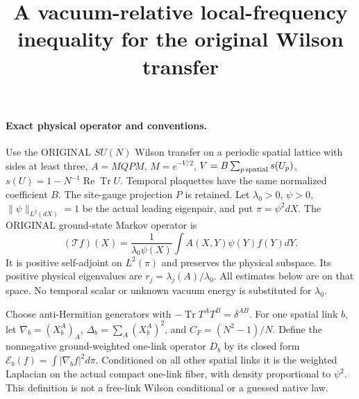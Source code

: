 \documentclass[11pt]{article}
\title{A vacuum-relative local-frequency inequality for the original Wilson transfer}\author{}\date{}
\begin{document}
\maketitle
\paragraph{Exact physical operator and conventions.}
Use the ORIGINAL $SU(N)$ Wilson transfer on a periodic spatial lattice with sides
at least three, $A=M Q P M$, $M=e^{-V/2}$, $V=B\sum_{p\,\rm spatial}s(U_p)$,
$s(U)=1-N^{-1}\operatorname{Re}\operatorname{Tr}U$. Temporal plaquettes have the
same normalized coefficient $B$. The site-gauge projection $P$ is retained.
Let $\lambda_0>0$, $\psi>0$, $\|\psi\|_{L^2(dX)}=1$ be the actual leading
eigenpair, and put $\pi=\psi^2dX$. The ORIGINAL ground-state Markov operator is
\[
 (\mathcal T f)(X)=\frac1{\lambda_0\psi(X)}
          \int A(X,Y)\psi(Y)f(Y)dY.                    \tag{1}
\]
It is positive self-adjoint on $L^2(\pi)$ and preserves the physical subspace.
Its positive physical eigenvalues are $r_j=\lambda_j(A)/\lambda_0$.
All estimates below are on that space. No temporal scalar or unknown vacuum
energy is substituted for $\lambda_0$.

Choose anti-Hermitian generators with $-\operatorname{Tr}T^AT^B=\delta^{AB}$.
For one spatial link $b$, let $\nabla_b=(X_b^A)_A$, $\Delta_b=\sum_A(X_b^A)^2$,
and $C_F=(N^2-1)/N$. Define the nonnegative ground-weighted one-link operator
$D_b$ by its closed form $\mathcal E_b(f)=\int|\nabla_b f|^2d\pi$.
Conditioned on all other spatial links it is the weighted Laplacian on the
actual compact one-link fiber, with density proportional to $\psi^2$.
This definition is not a free-link Wilson conditional or a guessed native law.
\end{document}
